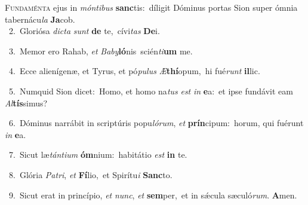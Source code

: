 \lettrine{\initial\textcolor{\initialcolor}{F}}{undaménta} ejus in \textit{món}\-\textit{ti}\textit{bus} \textbf{sanc}\-tis:~\star díligit Dóminus portas Sion super ómnia tabernácu\textit{la} \textbf{Ja}\-cob.\\
{\numbfont\textcolor{\numbcolor}{~2.}}~Gloriósa \textit{dic}\-\textit{ta} \textit{sunt} \textbf{de} te,~\star cívi\textit{tas} \textbf{De}\-i.\par
{\numbfont\textcolor{\numbcolor}{~3.}}~Memor ero Rahab, \textit{et} \textit{Ba}\-\textit{by}\textbf{ló}nis~\star scién\-\textit{ti}\-\textbf{um} me.\par
{\numbfont\textcolor{\numbcolor}{~4.}}~Ecce alienígenæ, et Tyrus, et pó\-\textit{pu}\-\textit{lus} \textit{Æ}\-\textbf{thí}opum,~\star hi fué\textit{runt} \textbf{il}\-lic.\par
{\numbfont\textcolor{\numbcolor}{~5.}}~Numquid Sion dicet:~\dagger Homo, et homo na\textit{tus} \textit{est} \textit{in} \textbf{e}\-a:~\star et ipse fundávit eam \textit{Al}\-\textbf{tís}simus?\par
{\numbfont\textcolor{\numbcolor}{~6.}}~Dóminus narrábit in scriptúris popu\-\textit{ló}\-\textit{rum}, \textit{et} \textbf{prín}\-cipum:~\star horum, qui fuérunt \textit{in} \textbf{e}\-a.\par
{\numbfont\textcolor{\numbcolor}{~7.}}~Sicut læ\-\textit{tán}\-\textit{ti}\textit{um} \textbf{óm}\-nium:~\star habitátio \textit{est} \textbf{in} te.\par
{\numbfont\textcolor{\numbcolor}{~8.}}~Glória \textit{Pa}\-\textit{tri}, \textit{et} \textbf{Fí}\-lio,~\star et Spirítu\textit{i} \textbf{Sanc}\-to.\par
{\numbfont\textcolor{\numbcolor}{~9.}}~Sicut erat in princípio, \textit{et} \textit{nunc}\-, \textit{et} \textbf{sem}\-per,~\star et in sǽcula sæculó\-\textit{rum}\-. \textbf{A}\-men.\par
